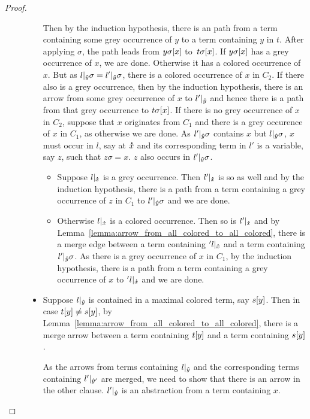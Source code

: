 \documentclass[,%
	paper=a4,%
	DIV11, %
	twoside=false,%
	liststotoc,
	bibtotoc,
	draft=false,%
	numbers=noendperiod
]{scrartcl}
\begin{document}
\begin{proof}
\begin{description}
\begin{itemize}
						Then by the induction hypothesis, there is an path from a term containing some grey occurrence of $y$ to a term containing $y$ in $t$.
						After applying $\sigma$, the path leads from $y\sigma[x]$ to~$t\sigma[x]$.
						If $y\sigma[x]$ has a grey occurrence of $x$, we are done.
						Otherwise it has a colored occurrence of $x$.
						But as $l|_{\bm\hat y}\sigma = l'|_{\bm\hat y}\sigma$, there is a colored occurrence of $x$ in $C_2$. 
						If there also is a grey occurrence, then by the induction hypothesis, there is an arrow from some grey occurrence of $x$ to $l'|_{\bm\hat y}$ and hence there is a path from that grey occurrence to $t\sigma[x]$.
						If there is no grey occurrence of $x$ in $C_2$, suppose that $x$ originates from $C_1$ and there is a grey occurence of $x$ in $C_1$, as otherwise we are done.
						As $l'|_{\bm\hat y}\sigma$ contains $x$ but $l|_{\bm\hat y}\sigma$, $x$ must occur in $l$, say at $\bm\dot x$ and its corresponding term in $l'$ is a variable, say $z$, such that $z\sigma = x$.
						$z$ also occurs in $l'|_{\bm\hat y}\sigma$.
						\begin{itemize}
							\item
								Suppose $l|_{\bm\dot x}$ is a grey occurrence. Then $l'|_{\bm\dot x}$ is so as well and by the induction hypothesis, there is a path from a term containing a grey occurrence of $z$ in $C_1$ to $l'|_{\bm\hat y}\sigma$ and we are done.
							\item
								Otherwise $l|_{\bm\dot x}$ is a colored occurrence.
								Then so is $l'|_{\bm\dot x}$ and by Lemma~\ref{lemma:arrow_from_all_colored_to_all_colored}, there is a merge edge between a term containing $'l|_{\bm\dot x}$ and a term containing $l'|_{\bm\hat y}\sigma$.
								As there is a grey occurrence of $x$ in $C_1$, by the induction hypothesis, there is a path from a term containing a grey occurrence of $x$ to $'l|_{\bm\dot x}$ and we are done.
						\end{itemize}



					\item Suppose $l|_{\bm\hat y}$ is contained in a maximal colored term, say $s[y]$.
						Then in case $t\occ{y} \neq\nolinebreak s\occ{y}$, by Lemma~\ref{lemma:arrow_from_all_colored_to_all_colored}, there is a merge arrow between a term containing $t[y]$ and a term containing $s[y]$.

						As the arrows from terms containing $l|_{\bm\hat y}$ and the corresponding terms containing $l'|_{\bm\hat y'}$ are merged, we need to show that there is an arrow in the other clause. $l'|_{\bm\hat y}$ is an abstraction from a term containing $x$.


\end{itemize}
\end{description}
\end{proof}
\end{document}
